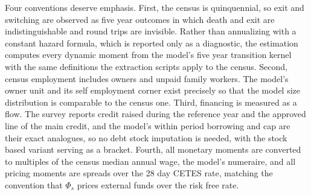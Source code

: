 \documentclass[12pt]{article}
\begin{document}
Four conventions deserve emphasis. First, the census is quinquennial, so exit and switching are observed as five year outcomes in which death and exit are indistinguishable and round trips are invisible. Rather than annualizing with a constant hazard formula, which is reported only as a diagnostic, the estimation computes every dynamic moment from the model's five year transition kernel with the same definitions the extraction scripts apply to the census. Second, census employment includes owners and unpaid family workers. The model's owner unit and its self employment corner exist precisely so that the model size distribution is comparable to the census one. Third, financing is measured as a flow. The survey reports credit raised during the reference year and the approved line of the main credit, and the model's within period borrowing and cap are their exact analogues, so no debt stock imputation is needed, with the stock based variant serving as a bracket. Fourth, all monetary moments are converted to multiples of the census median annual wage, the model's numeraire, and all pricing moments are spreads over the 28 day CETES rate, matching the convention that $\Phi_{s}$ prices external funds over the risk free rate.
 
\end{document}
